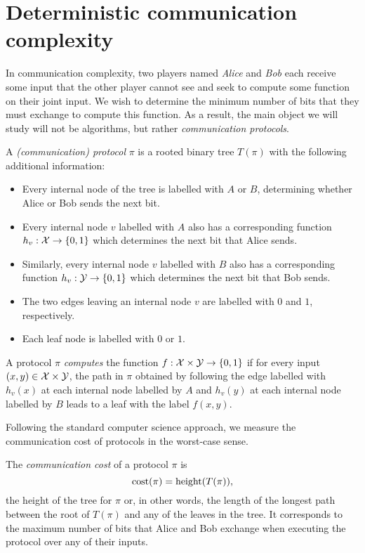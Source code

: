 \chapter[Deterministic complexity]{Deterministic communication complexity}

In communication complexity, two players named \emph{Alice} and \emph{Bob} each receive some input that the other player cannot see and seek to compute some function on their joint input. We wish to determine the minimum number of bits that they must exchange to compute this function. As a result, the main object we will study will not be algorithms, but rather \emph{communication protocols}. 

\begin{definition}[Protocol]
A \emph{(communication) protocol} $\pi$ is a rooted binary tree $T(\pi)$ with the following additional information:
\begin{itemize}
\item Every internal node of the tree is labelled with $A$ or $B$, determining whether Alice or Bob sends the next bit.
\item Every internal node $v$ labelled with $A$ also has a corresponding function $h_v : \mathcal{X} \to \{0,1\}$ which determines the next bit that Alice sends.
\item Similarly, every internal node $v$ labelled with $B$ also has a corresponding function $h_v : \mathcal{Y} \to \{0,1\}$ which determines the next bit that Bob sends.
\item The two edges leaving an internal node $v$ are labelled with $0$ and $1$, respectively.
\item Each leaf node is labelled with $0$ or $1$.
\end{itemize}
\end{definition}

\begin{definition}
A protocol $\pi$ \emph{computes} the function $f : \mathcal{X} \times \mathcal{Y} \to \{0,1\}$ if for every input $(x,y) \in \mathcal{X} \times \mathcal{Y}$, the path in $\pi$ obtained by following the edge labelled with $h_v(x)$ at each internal node labelled by $A$ and $h_v(y)$ at each internal node labelled by $B$ leads to a leaf with the label $f(x,y)$.
\end{definition}

Following the standard computer science approach, we measure the communication cost of protocols in the worst-case sense.

\begin{definition}
The \emph{communication cost} of a protocol $\pi$ is 
\[
\mathrm{cost}(\pi) = \mathrm{height}(T(\pi)),
\]
the height of the tree for $\pi$ or, in other words, the length of the longest path between the root of $T(\pi)$ and any of the leaves in the tree.
It corresponds to the maximum number of bits that Alice and Bob exchange when executing the protocol over any of their inputs.
\end{definition}


